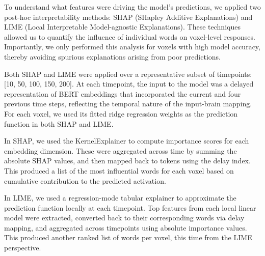 \documentclass{article}
\begin{document}
To understand what features were driving the model’s predictions, we applied two post-hoc interpretability methods: SHAP (SHapley Additive Explanations) and LIME (Local Interpretable Model-agnostic Explanations). These techniques allowed us to quantify the influence of individual words on voxel-level responses. Importantly, we only performed this analysis for voxels with high model accuracy, thereby avoiding spurious explanations arising from poor predictions.

Both SHAP and LIME were applied over a representative subset of timepoints: [10, 50, 100, 150, 200]. At each timepoint, the input to the model was a delayed representation of BERT embeddings that incorporated the current and four previous time steps, reflecting the temporal nature of the input-brain mapping. For each voxel, we used its fitted ridge regression weights as the prediction function in both SHAP and LIME.

In SHAP, we used the KernelExplainer to compute importance scores for each embedding dimension. These were aggregated across time by summing the absolute SHAP values, and then mapped back to tokens using the delay index. This produced a list of the most influential words for each voxel based on cumulative contribution to the predicted activation.

In LIME, we used a regression-mode tabular explainer to approximate the prediction function locally at each timepoint. Top features from each local linear model were extracted, converted back to their corresponding words via delay mapping, and aggregated across timepoints using absolute importance values. This produced another ranked list of words per voxel, this time from the LIME perspective.

\begin{table}[h]
\centering
{}
\caption{Top-5 influential tokens per voxel identified by SHAP and LIME for \textit{sloth}.}
\label{tab:shap_lime_sloth_resized}
\end{table}
\end{document}
